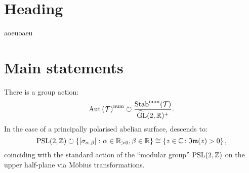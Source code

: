 \documentclass[]{article}
\newcommand{\gltworplustilde}{\widetilde{\mathrm{GL}}(2,\RR)}
\begin{document}
\maketitle
\tableofcontents

\section{Heading}
aoeuoaeu

\section{Main statements}

\begin{theorem}
	There is a group action:
	\[
		\aut\left(\triangcat\right)^{\mathrm{num}}
		\circlearrowright
		\frac{
			\stab^{\mathrm{num}}(\triangcat)
		}{
			\gltworplustilde^+
		}.
	\]
	\noindent
	In the case of a principally polarised abelian surface, descends to:
	\[
		\mathrm{PSL}(2, \mathbb{Z})
		\circlearrowright
		\left\{
		\left[\sigma_{\alpha, \beta}\right]
		\colon
		\alpha \in \mathbb{R}_{>0}, \beta \in \mathbb{R}
		\right\}
		\cong
		\left\{
		z \in \mathbb{C}
		\colon
		\mathfrak{Im}(z) > 0
		\right\},
	\]
	coinciding with the standard action of
	the ``modular group'' $\mathrm{PSL}(2, \mathbb{Z})$
	on the upper half-plane via Möbius transformations.
\end{theorem}
\end{document}
